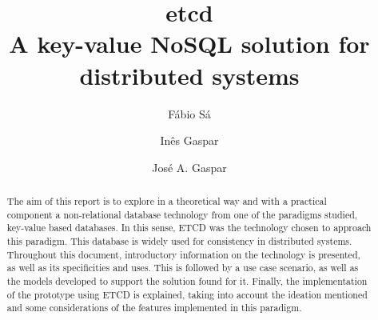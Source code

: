 \documentclass[screen,review]{acmart}
\begin{document}
\title[etcd]{etcd \\
A key-value NoSQL solution for distributed systems }

\author{Fábio Sá}

\author{Inês Gaspar}

\author{José A. Gaspar}


\renewcommand{\shortauthors}{F. Sá, I. Gaspar, J. A. Gaspar}

\begin{abstract}
The aim of this report is to explore in a theoretical way and with a practical component a non-relational database technology from one of the paradigms studied, key-value based databases. In this sense, ETCD was the technology chosen to approach this paradigm. This database is widely used for consistency in distributed systems.
Throughout this document, introductory information on the technology is presented, as well as its specificities and uses. This is followed by a use case scenario, as well as the models developed to support the solution found for it. Finally, the implementation of the prototype using ETCD is explained, taking into account the ideation mentioned and some considerations of the features implemented in this paradigm.
\end{abstract}


\end{document}
